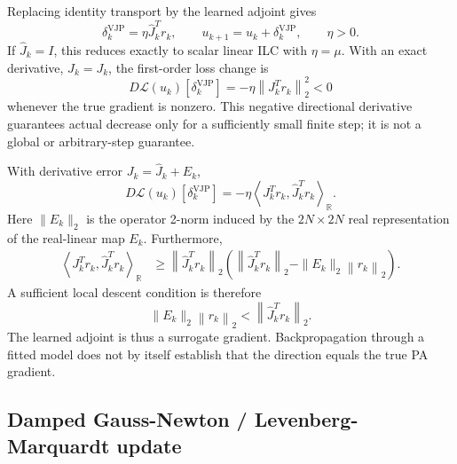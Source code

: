 \documentclass[10pt,a4paper]{article}
\newcommand{\Rinner}[2]{\left\langle #1,#2\right\rangle_{\mathbb R}}
\newcommand{\norm}[1]{\left\lVert #1\right\rVert_2}
\newcommand{\Jhat}{\widehat J}
\begin{document}
Replacing identity transport by the learned adjoint gives
\begin{equation}
  \delta_k^{\mathrm{VJP}}=\eta\Jhat_k^T r_k,
  \qquad
  u_{k+1}=u_k+\delta_k^{\mathrm{VJP}},
  \qquad \eta>0.
  \label{eq:raw-vjp}
\end{equation}
If $\Jhat_k=I$, this reduces exactly to scalar linear ILC with $\eta=\mu$. With an exact derivative,
$\Jhat_k=J_k$, the first-order loss change is
\begin{equation}
  D\mathcal L(u_k)[\delta_k^{\mathrm{VJP}}]
  =-\eta\norm{J_k^T r_k}^{2}<0
  \label{eq:exact-vjp-descent}
\end{equation}
whenever the true gradient is nonzero. This negative directional derivative guarantees actual decrease only
for a sufficiently small finite step; it is not a global or arbitrary-step guarantee.

With derivative error $J_k=\Jhat_k+E_k$,
\begin{equation}
  D\mathcal L(u_k)[\delta_k^{\mathrm{VJP}}]
  =-\eta\Rinner{J_k^T r_k}{\Jhat_k^T r_k}.
\end{equation}
Here $\|E_k\|_2$ is the operator 2-norm induced by the $2N\times2N$ real representation of the real-linear
map $E_k$.
Furthermore,
\begin{align}
  \Rinner{J_k^T r_k}{\Jhat_k^T r_k}
  &\geq \norm{\Jhat_k^T r_k}
  \left(
    \norm{\Jhat_k^T r_k}-\|E_k\|_2\norm{r_k}
  \right).
  \label{eq:model-error-bound}
\end{align}
A sufficient local descent condition is therefore
\begin{equation}
  \|E_k\|_2\norm{r_k}<\norm{\Jhat_k^T r_k}.
  \label{eq:model-quality-condition}
\end{equation}
The learned adjoint is thus a surrogate gradient. Backpropagation through a fitted model does not by itself
establish that the direction equals the true PA gradient.

\subsection{Damped Gauss-Newton / Levenberg-Marquardt update}
\end{document}
